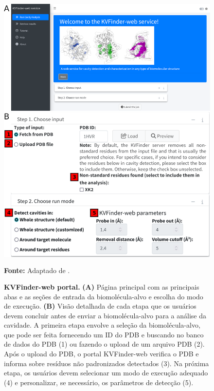 \documentclass[Portugues]{phdquali}
\begin{document}
\begin{figure}[H]
  \centering
  \includegraphics[scale=0.75]{images/kvweb-interface.png}
  \centerline{\scriptsize{\textbf{Fonte:} Adaptado de \cite{guerra2023A}.}}
  \caption[KVFinder-web portal]{\textbf{KVFinder-web portal.} \textbf{(A)} Página principal com as principais abas e as seções de entrada da biomolécula-alvo e escolha do modo de execução. \textbf{(B)} Visão detalhada de cada etapa que os usuários devem concluir antes de enviar a biomolécula-alvo para a análise da cavidade. A primeira etapa envolve a seleção da biomolécula-alvo, que pode ser feita fornecendo um ID do PDB e buscando no banco de dados do PDB (1) ou fazendo o upload de um arquivo PDB (2). Após o upload do PDB, o portal KVFinder-web verifica o PDB e informa sobre resíduos não padronizados detectados (3). Na próxima etapa, os usuários devem selecionar um modo de execução adequado (4) e personalizar, se necessário, os parâmetros de detecção (5).}
  \label{fig:kvweb-interface}
\end{figure}
\end{document}
